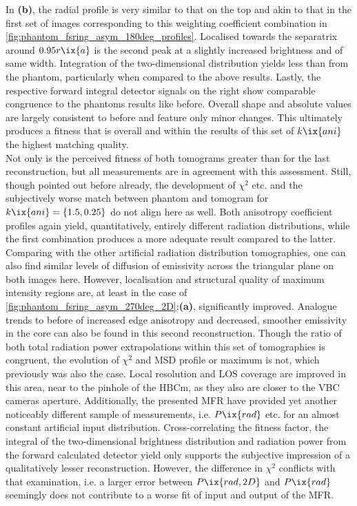                 In \textbf{(b)}, the radial profile is very similar to that on the top and akin to that in the first set of images corresponding to this weighting coefficient combination in \cref{fig:phantom_fsring_asym_180deg_profiles}. Localised towards the separatrix around $0.95r\ix{a}$ is the second peak at a slightly increased brightness and of same width. Integration of the two-dimensional distribution yields less than from the phantom, particularly when compared to the above results. Lastly, the respective forward integral detector signals on the right show comparable congruence to the phantoms results like before. Overall shape and absolute values are largely consistent to before and feature only minor changes. This ultimately produces a fitness that is overall and within the results of this set of $k\ix{ani}$ the highest matching quality.\\%
                Not only is the perceived fitness of both tomograms greater than for the last reconstruction, but all measurements are in agreement with this assessment. Still, though pointed out before already, the development of $\chi^{2}$ etc. and the subjectively worse match between phantom and tomogram for $k\ix{ani}=\left\{1.5, 0.25\right\}$ do not align here as well. Both anisotropy coefficient profiles again yield, quantitatively, entirely different radiation distributions, while the first combination produces a more adequate result compared to the latter. Comparing with the other artificial radiation distribution tomographies, one can also find similar levels of diffusion of emissivity across the triangular plane on both images here. However, localisation and structural quality of maximum intensity regions are, at least in the case of \cref{fig:phantom_fsring_asym_270deg_2D}:\textbf{(a)}, significantly improved. Analogue trends to before of increased edge anisotropy and decreased, smoother emissivity in the core can also be found in this second reconstruction. Though the ratio of both total radiation power extrapolations within this set of tomographies is congruent, the evolution of $\chi^{2}$ and MSD profile or maximum is not, which previously was also the case. Local resolution and LOS coverage are improved in this area, near to the pinhole of the HBCm, as they also are closer to the VBC cameras aperture. Additionally, the presented MFR have provided yet another noticeably different sample of measurements, i.e. $P\ix{rad}$ etc. for an almost constant artificial input distribution. Cross-correlating the fitness factor, the integral of the two-dimensional brightness distribution and radiation power from the forward calculated detector yield only supports the subjective impression of a qualitatively lesser reconstruction. However, the difference in $\chi^{2}$ conflicts with that examination, i.e. a larger error between $P\ix{rad,2D}$ and $P\ix{rad}$ seemingly does not contribute to a worse fit of input and output of the MFR.\\%
